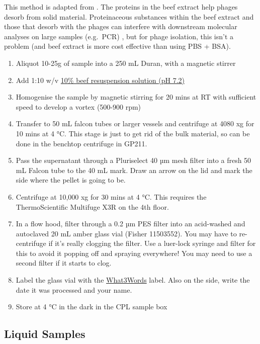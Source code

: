 \documentclass[
]{book}
\providecommand{\tightlist}{%
  \setlength{\itemsep}{0pt}\setlength{\parskip}{0pt}}
\begin{document}
This method is adapted from \citep{Guzman2007-na}. The proteins in the beef extract help phages desorb from solid material. Proteinaceous substances within the beef extract and those that desorb with the phages can interfere with downstream molecular analyses on large samples (e.g.~PCR) \citep{Goller2020-wx}, but for phage isolation, this isn't a problem (and beef extract is more cost effective than using PBS + BSA).

\begin{enumerate}
\def\labelenumi{\arabic{enumi}.}
\tightlist
\item
  Aliquot 10-25g of sample into a 250 mL Duran, with a magnetic stirrer
\item
  Add 1:10 w/v \protect\hyperlink{beef-resuspension-solution}{10\% beef resuspension solution (pH 7.2)}
\item
  Homogenise the sample by magnetic stirring for 20 mins at RT with sufficient speed to develop a vortex (500-900 rpm)
\item
  Transfer to 50 mL falcon tubes or larger vessels and centrifuge at 4080 xg for 10 mins at 4 °C. This stage is just to get rid of the bulk material, so can be done in the benchtop centrifuge in GP211.
\item
  Pass the supernatant through a Pluriselect 40 µm mesh filter into a fresh 50 mL Falcon tube to the 40 mL mark. Draw an arrow on the lid and mark the side where the pellet is going to be.
\item
  Centrifuge at 10,000 xg for 30 mins at 4 °C. This requires the ThermoScientific Multifuge X3R on the 4th floor.
\item
  In a flow hood, filter through a 0.2 µm PES filter into an acid-washed and autoclaved 20 mL amber glass vial (Fisher 11503552). You may have to re-centrifuge if it's really clogging the filter. Use a luer-lock syringe and filter for this to avoid it popping off and spraying everywhere! You may need to use a second filter if it starts to clog.
\item
  Label the glass vial with the \href{https://what3words.com/}{What3Words} label. Also on the side, write the date it was processed and your name.
\item
  Store at 4 °C in the dark in the CPL sample box
  \newpage
\end{enumerate}

\hypertarget{liquid-samples}{%
\subsection{Liquid Samples}\label{liquid-samples}}
\end{document}
